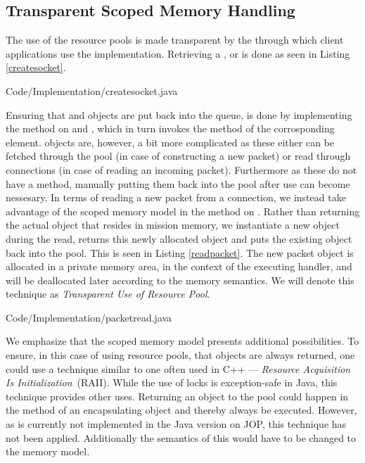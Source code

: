 \subsection{Transparent Scoped Memory Handling} %
\label{sub:transparent_memory_}
The use of the resource pools is made transparent by the  through which client applications use the implementation. Retrieving a ,  or  is done as seen in Listing \ref{createsocket}.

{Code/Implementation/createsocket.java}

Ensuring that  and  objects are put back into the queue, is done by implementing the  method on  and , which in turn invokes the  method of the corrosponding element. %
 objects are, however, a bit more complicated as these either can be fetched through the pool (in case of constructing a new packet) or read through connections (in case of reading an incoming packet). Furthermore as these do not have a  method, manually putting them back into the pool after use can become nessesary. In terms of reading a new packet from a connection, we instead take advantage of the scoped memory model in the  method on . Rather than returning the actual  object that resides in mission memory, we instantiate a new object during the read, returns this newly allocated  object and puts the existing object back into the pool. This is seen in Listing \ref{readpacket}. The new packet object is allocated in a private memory area, in the context of the executing handler, and will be deallocated later according to the memory semantics. We will denote this technique as \textit{Transparent Use of Resource Pool}.

{Code/Implementation/packetread.java}

We emphasize that the scoped memory model presents additional possibilities. To ensure, in this case of using resource pools, that objects are always returned, one could use a technique similar to one often used in C++ --- \textit{Resource Acquisition Is Initialization}~(RAII)\cite{RAII}. While the use of locks is exception-safe in Java, this technique provides other uses. Returning an object to the pool could happen in the  method of an encapsulating object and thereby always be executed. However, as  is currently not implemented in the Java version on JOP, this technique has not been applied. Additionally the semantics of this would have to be changed to the memory model.